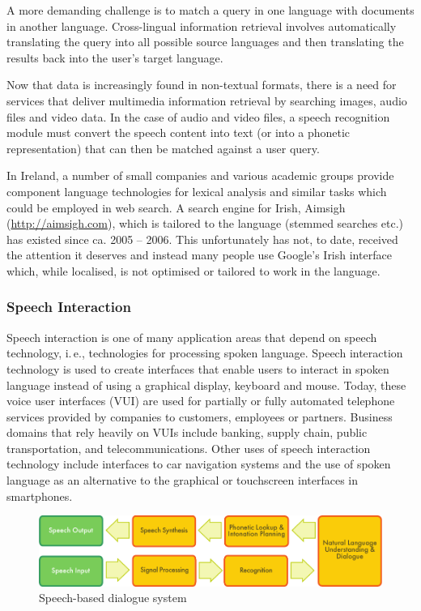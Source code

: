 \begin{multicols}{2}

A more demanding challenge is to match a query in one language with documents in another language. Cross-lingual information retrieval involves automatically translating the query into all possible source languages and then translating the results back into the user's target language.

Now that data is increasingly found in non-textual formats, there is a need for services that deliver multimedia information retrieval by searching images, audio files and video data. In the case of audio and video files, a speech recognition module must convert the speech content into text (or into a phonetic representation) that can then be matched against a user query.

In Ireland, a number of small companies and various academic groups provide component language technologies for lexical analysis and similar tasks which could be employed in web search. A search engine for Irish, Aimsigh (\url{http://aimsigh.com}), which is tailored to the language (stemmed searches etc.) has existed since ca. 2005 -- 2006. This unfortunately has not, to date, received the attention it deserves and instead many people use Google’s Irish interface which, while localised, is not optimised or tailored to work in the language.

\subsubsection{Speech Interaction}

Speech interaction is one of many application areas that depend on speech technology, i.\,e., technologies for processing spoken language. Speech interaction technology is used to create interfaces that enable users to interact in spoken language instead of using a graphical display, keyboard and mouse.  Today, these voice user interfaces (VUI) are used for partially or fully automated telephone services provided by companies to customers, employees or partners. Business domains that rely heavily on VUIs include banking, supply chain, public transportation, and telecommunications. Other uses of speech interaction technology include interfaces to car navigation systems and the use of spoken language as an alternative to the graphical or touchscreen interfaces in smartphones.

\begin{figure}[htb]
  \center
  \includegraphics[width=\textwidth]{../_media/english/simple_speech-based_dialogue_architecture}
  \caption{Speech-based dialogue system}
\label{fig:dialoguearch_en}
\end{figure}


\end{multicols}
